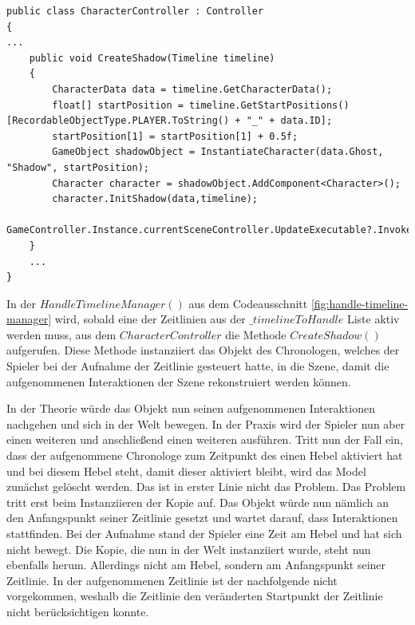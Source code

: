 \begin{lstlisting}[caption={Ausschnitt CharacterController.cs}, label={lst:character-controller}]
public class CharacterController : Controller
{
...
    public void CreateShadow(Timeline timeline)
    {
        CharacterData data = timeline.GetCharacterData();
        float[] startPosition = timeline.GetStartPositions()[RecordableObjectType.PLAYER.ToString() + "_" + data.ID];
        startPosition[1] = startPosition[1] + 0.5f;
        GameObject shadowObject = InstantiateCharacter(data.Ghost, "Shadow", startPosition);
        Character character = shadowObject.AddComponent<Character>();
        character.InitShadow(data,timeline);
        GameController.Instance.currentSceneController.UpdateExecutable?.Invoke();
    }
    ...
}

\end{lstlisting}

In der $HandleTimelineManager()$ aus dem Codeausschnitt \ref{fig:handle-timeline-manager} wird, sobald eine der Zeitlinien aus der $\_timelineToHandle$ Liste aktiv werden muss, aus dem $CharacterController$ die Methode $CreateShadow()$ aufgerufen. Diese Methode instanziiert das Objekt des Chronologen, welches der Spieler bei der Aufnahme der Zeitlinie gesteuert hatte, in die Szene, damit die aufgenommenen Interaktionen der Szene rekonstruiert werden können.

In der Theorie würde das Objekt nun seinen aufgenommenen Interaktionen nachgehen und sich in der Welt bewegen. 
In der Praxis wird der Spieler nun aber einen weiteren  und anschließend einen weiteren  ausführen. Tritt nun der Fall ein, dass der aufgenommene Chronologe zum Zeitpunkt des  einen Hebel aktiviert hat und bei diesem Hebel steht, damit dieser aktiviert bleibt, wird das Model zunächst gelöscht werden. Das ist in erster Linie nicht das Problem. Das Problem tritt erst beim Instanziieren der Kopie auf. Das Objekt würde nun nämlich an den Anfangspunkt seiner Zeitlinie gesetzt und wartet darauf, dass Interaktionen stattfinden. Bei der Aufnahme stand der Spieler eine Zeit am Hebel und hat sich nicht bewegt. Die Kopie, die nun in der Welt instanziiert wurde, steht nun ebenfalls herum. Allerdings nicht am Hebel, sondern am Anfangspunkt seiner Zeitlinie. In der aufgenommenen Zeitlinie ist der nachfolgende  nicht vorgekommen, weshalb die Zeitlinie den veränderten Startpunkt der Zeitlinie nicht berücksichtigen konnte. 

